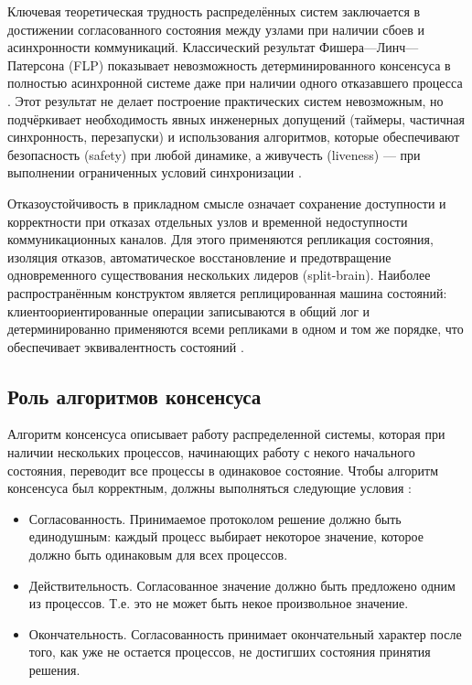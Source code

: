 Ключевая теоретическая трудность распределённых систем заключается в достижении
согласованного состояния между узлами при наличии сбоев и асинхронности
коммуникаций. Классический результат Фишера—Линч—Патерсона (FLP) показывает
невозможность детерминированного консенсуса в полностью асинхронной системе
даже при наличии одного отказавшего процесса \cite{flp1985}. Этот результат не
делает построение практических систем невозможным, но подчёркивает
необходимость явных инженерных допущений (таймеры, частичная синхронность,
перезапуски) и использования алгоритмов, которые обеспечивают безопасность
(safety) при любой динамике, а живучесть (liveness) — при выполнении
ограниченных условий синхронизации \cite{lynch1996,birman2012}.

Отказоустойчивость в прикладном смысле означает сохранение доступности и
корректности при отказах отдельных узлов и временной недоступности
коммуникационных каналов. Для этого применяются репликация состояния, изоляция
отказов, автоматическое восстановление и предотвращение одновременного
существования нескольких лидеров (split-brain). Наиболее распространённым
конструктом является реплицированная машина состояний: клиентоориентированные
операции записываются в общий лог и детерминированно применяются всеми
репликами в одном и том же порядке, что обеспечивает эквивалентность состояний
\cite{coulouris2012,lynch1996}.

\subsection{Роль алгоритмов консенсуса}

Алгоритм консенсуса описывает работу распределенной системы, которая при наличии
нескольких процессов, начинающих работу с некого начального состояния, переводит
все процессы в одинаковое состояние. Чтобы алгоритм консенсуса был корректным,
должны выполняться следующие условия \cite{petrov}:

\begin{itemize}
    \item Согласованность. Принимаемое протоколом решение должно быть единодушным:
        каждый процесс  выбирает некоторое значение, которое должно быть
        одинаковым для всех процессов.
    \item Действительность. Согласованное значение должно быть предложено одним
        из процессов. Т.е. это не может быть некое произвольное значение.
    \item Окончательность. Согласованность принимает окончательный характер после
        того, как уже не остается процессов, не достигших состояния принятия решения.
\end{itemize}

